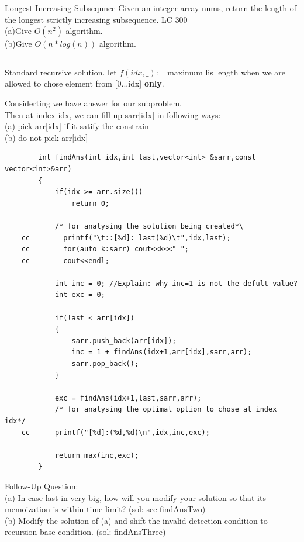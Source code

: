 \begin{problem}{Longest Increasing Subsequnce}
    Given an integer array nums, return the length of the longest strictly increasing subsequence. LC 300\\
    (a)Give $O(n^2)$ algorithm.\\
    (b)Give $O(n*log(n))$ algorithm.
\end{problem}

\begin{solution}
    \vspace{2mm}
    \hrule
    \vspace{2mm}

    Standard recursive solution.
    let $f(idx,\_)$:= maximum lis length when we are allowed to chose element from [0...idx] \textbf{only}.

    \medskip
    Considerting we have answer for our subproblem.\\
    Then at index idx, we can fill up sarr[idx] in following ways:\\
    (a) pick arr[idx] if it satify the constrain\\
    (b) do not pick arr[idx]\\

    \begin{verbatim}
        int findAns(int idx,int last,vector<int> &sarr,const vector<int>&arr)
        {
            if(idx >= arr.size())
                return 0;
            
            /* for analysing the solution being created*\
    cc        printf("\t::[%d]: last(%d)\t",idx,last);
    cc        for(auto k:sarr) cout<<k<<" ";
    cc        cout<<endl;
                  
            int inc = 0; //Explain: why inc=1 is not the defult value?
            int exc = 0;
            
            if(last < arr[idx])
            {
                sarr.push_back(arr[idx]);
                inc = 1 + findAns(idx+1,arr[idx],sarr,arr);
                sarr.pop_back();
            }
            
            exc = findAns(idx+1,last,sarr,arr);   
            /* for analysing the optimal option to chose at index idx*/    
    cc      printf("[%d]:(%d,%d)\n",idx,inc,exc);
            
            return max(inc,exc);           
        }
    \end{verbatim}

    Follow-Up Question:\\
        (a) In case last in very big, how will you modify your solution so that its memoization is within time limit? (sol: see findAnsTwo)\\
        (b) Modify the solution of (a) and shift the invalid detection condition to recursion base condition. (sol: findAnsThree)

\end{solution}

